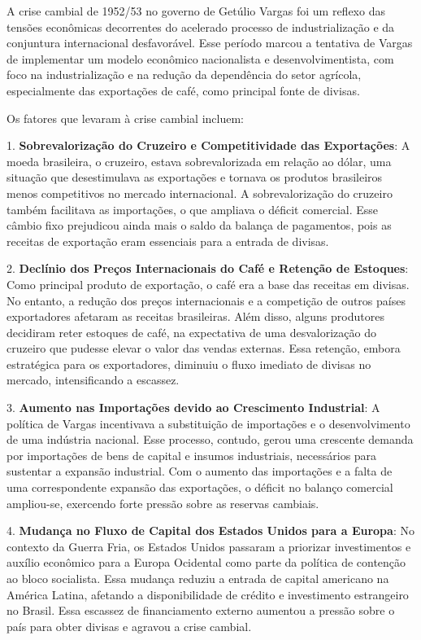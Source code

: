 \documentclass[a4paper,12pt]{article}[abntex2]
\begin{document}
A crise cambial de 1952/53 no governo de Getúlio Vargas foi um reflexo das tensões econômicas decorrentes do acelerado processo de industrialização e da conjuntura internacional desfavorável. Esse período marcou a tentativa de Vargas de implementar um modelo econômico nacionalista e desenvolvimentista, com foco na industrialização e na redução da dependência do setor agrícola, especialmente das exportações de café, como principal fonte de divisas.

Os fatores que levaram à crise cambial incluem:

1. \textbf{Sobrevalorização do Cruzeiro e Competitividade das Exportações}: A moeda brasileira, o cruzeiro, estava sobrevalorizada em relação ao dólar, uma situação que desestimulava as exportações e tornava os produtos brasileiros menos competitivos no mercado internacional. A sobrevalorização do cruzeiro também facilitava as importações, o que ampliava o déficit comercial. Esse câmbio fixo prejudicou ainda mais o saldo da balança de pagamentos, pois as receitas de exportação eram essenciais para a entrada de divisas.

2. \textbf{Declínio dos Preços Internacionais do Café e Retenção de Estoques}: Como principal produto de exportação, o café era a base das receitas em divisas. No entanto, a redução dos preços internacionais e a competição de outros países exportadores afetaram as receitas brasileiras. Além disso, alguns produtores decidiram reter estoques de café, na expectativa de uma desvalorização do cruzeiro que pudesse elevar o valor das vendas externas. Essa retenção, embora estratégica para os exportadores, diminuiu o fluxo imediato de divisas no mercado, intensificando a escassez.

3. \textbf{Aumento nas Importações devido ao Crescimento Industrial}: A política de Vargas incentivava a substituição de importações e o desenvolvimento de uma indústria nacional. Esse processo, contudo, gerou uma crescente demanda por importações de bens de capital e insumos industriais, necessários para sustentar a expansão industrial. Com o aumento das importações e a falta de uma correspondente expansão das exportações, o déficit no balanço comercial ampliou-se, exercendo forte pressão sobre as reservas cambiais.

4. \textbf{Mudança no Fluxo de Capital dos Estados Unidos para a Europa}: No contexto da Guerra Fria, os Estados Unidos passaram a priorizar investimentos e auxílio econômico para a Europa Ocidental como parte da política de contenção ao bloco socialista. Essa mudança reduziu a entrada de capital americano na América Latina, afetando a disponibilidade de crédito e investimento estrangeiro no Brasil. Essa escassez de financiamento externo aumentou a pressão sobre o país para obter divisas e agravou a crise cambial.
\end{document}
